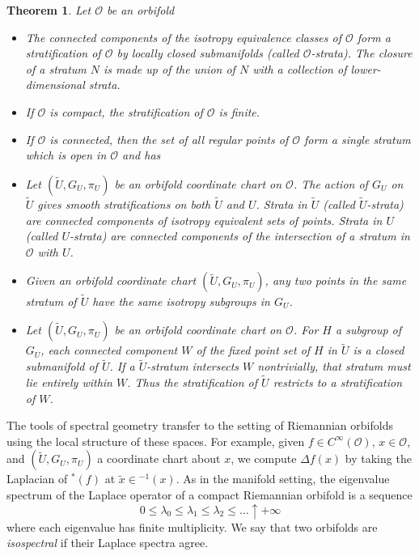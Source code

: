 \documentclass{amsart}
\theoremstyle{plain}
\newtheorem{theorem}[thm]{Theorem}
\theoremstyle{definition}
\theoremstyle{remark}
\newcommand{\ld}{\lambda}
\newcommand{\wtu}{\widetilde{U}}
\newcommand{\orb}{\mathcal O}
\newcommand{\cc}{(\widetilde{U}, G_U, \pi_U)}
\begin{document}
 \begin{theorem}\label{stratification} Let $\orb$ be an orbifold 
\begin{itemize}
\item[a.]  The connected components of the isotropy equivalence classes of $\orb$ form a stratification of $\orb$ by locally closed submanifolds (called \emph{$\orb$-strata}).  The closure of a stratum $N$ is made up of the union of $N$ with a collection of lower-dimensional strata.  
\item[b.] If $\orb$ is compact, the stratification of $\orb$ is finite.
\item[c.] If $\orb$ is connected, then the set of all regular points of
    $\orb$ form a single stratum which is open in $\orb$ and has 
\item[d.] Let $\cc$ be an orbifold coordinate chart on $\orb$.  The action of $G_U$ on $\wtu$ gives smooth stratifications on both $\wtu$ and $U$. Strata in $\wtu$ (called \emph{$\wtu$-strata}) are connected components of isotropy equivalent sets of points. Strata in $U$ (called \emph{$U$-strata}) are connected components of the intersection of a stratum in $\orb$ with $U$.  
\item[e.] Given an orbifold coordinate chart $\cc$, any two points in the same stratum of $\wtu$ have the same isotropy subgroups in $G_U$. 
\item[f.] Let $\cc$ be an orbifold coordinate chart on $\orb$.  For $H$ a subgroup of $G_U$, each connected component $W$ of the fixed point set of $H$ in $\wtu$ is a closed submanifold of $\wtu$.  If a $\wtu$-stratum intersects $W$ nontrivially, that stratum must lie entirely within $W$. Thus the stratification of $\wtu$ restricts to a stratification of $W$.
\end{itemize}
\end{theorem}



The tools of spectral geometry transfer to the setting of Riemannian
orbifolds using the local structure of these spaces. For example, given
$f\in C^\infty(\orb)$, $x\in \orb$, and $\cc$ a coordinate chart about $x$,
we compute $\Delta f (x)$ by taking the Laplacian of
$^*(f)$  at $\tilde{x} \in
$$^{-1}(x)$.  As in the manifold setting, the eigenvalue spectrum of the Laplace operator of a compact Riemannian orbifold is a sequence
$$
0 \le \ld_0 \le \ld_1 \le \ld_2 \le\dots \uparrow +\infty
$$
where each eigenvalue has finite multiplicity.  We say that two orbifolds are \emph{isospectral} if their Laplace spectra agree.
\end{document}
